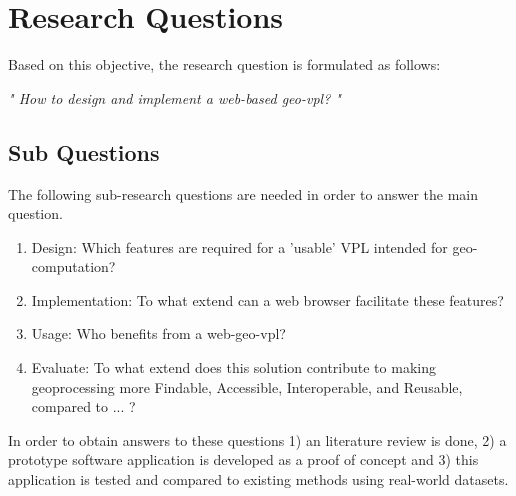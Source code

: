 \section{Research Questions}
Based on this objective, the research question is formulated as follows: 

\textit{" How to design and implement a web-based geo-vpl? "} %


\subsection*{Sub Questions}
The following sub-research questions are needed in order to answer the main question. 

\begin{enumerate}[a]
  \item Design: Which features are required for a 'usable' VPL intended for geo-computation? 
  \item Implementation: To what extend can a web browser facilitate these features?
  \item Usage: Who benefits from a web-geo-vpl? 
  \item Evaluate: To what extend does this solution contribute to making geoprocessing more Findable, Accessible, Interoperable, and Reusable, compared to ... ?  
\end{enumerate}

In order to obtain answers to these questions 
1) an literature review is done, 
2) a prototype software application is developed as a proof of concept and 
3) this application is tested and compared to existing methods using real-world datasets.





